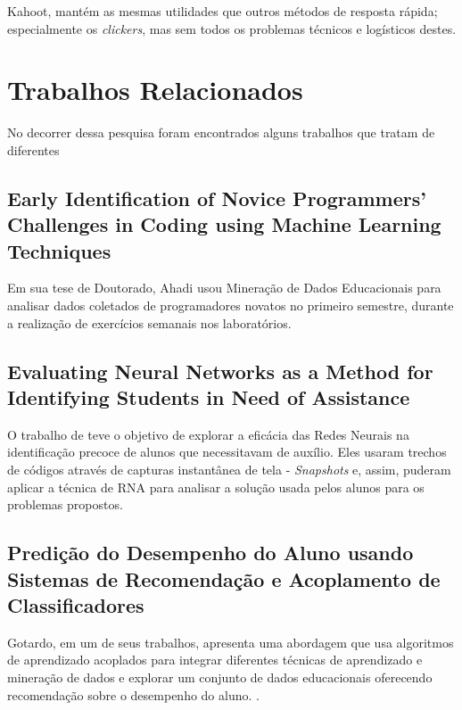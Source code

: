 \documentclass[
	12pt,				%
	openright,			%
	oneside,
	a4paper,			%
	english,			%
	french,				%
	spanish,			%
	brazil,				%
	]{abntex2}
\begin{document}
Kahoot, mantém as mesmas utilidades que outros métodos de resposta rápida; especialmente os \textit{clickers}, mas sem todos os problemas técnicos e logísticos destes. \cite{pintor2014kahoot}

\section{Trabalhos Relacionados}
\label{sec:TR}
No decorrer dessa pesquisa foram encontrados alguns trabalhos que tratam de diferentes 

\subsection{Early Identification of Novice Programmers' Challenges in Coding using Machine Learning Techniques}
\label{sec:Early}
Em sua tese de Doutorado, Ahadi usou Mineração de Dados Educacionais para analisar dados coletados de programadores novatos no primeiro semestre, durante a realização de exercícios semanais nos laboratórios. \cite{ahadi2016early}

\subsection{Evaluating Neural Networks as a Method for Identifying Students in Need of Assistance}
\label{sec:Evaluating}
O trabalho de \cite{Castro-Wunsch2017} teve o objetivo de explorar a eficácia das Redes Neurais na identificação precoce de alunos que necessitavam de auxílio. Eles usaram trechos de códigos através de capturas instantânea de tela - \textit{Snapshots} e, assim, puderam aplicar a técnica de RNA para analisar a solução usada pelos alunos para os problemas propostos.

\subsection{Predição do Desempenho do Aluno usando Sistemas de Recomendação e Acoplamento de Classificadores}
\label{sec:Pred1}
Gotardo, em um de seus trabalhos, apresenta uma abordagem que usa algoritmos de aprendizado acoplados para integrar diferentes técnicas de aprendizado e mineração de dados e explorar um conjunto de dados educacionais oferecendo recomendação sobre o desempenho do aluno. \cite{gotardo2013prediccao}.
\end{document}
